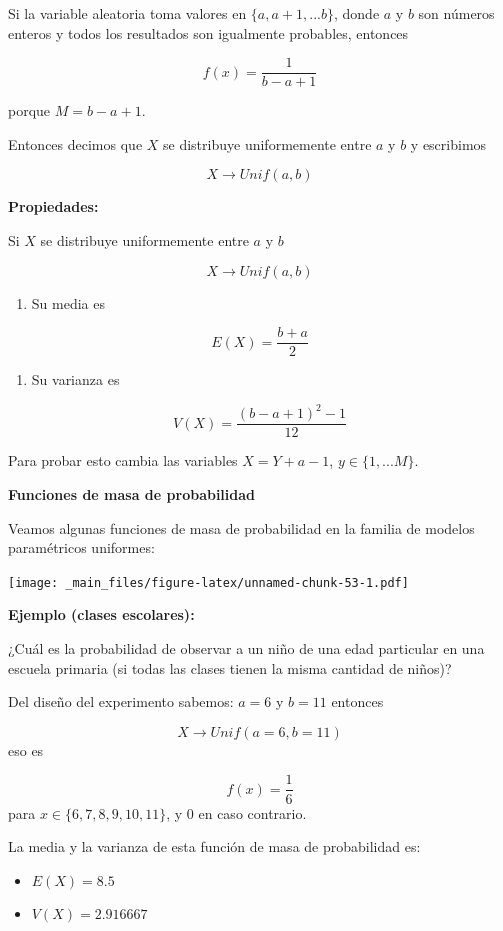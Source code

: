 \documentclass[
]{book}
\providecommand{\tightlist}{%
  \setlength{\itemsep}{0pt}\setlength{\parskip}{0pt}}
\begin{document}
Si la variable aleatoria toma valores en \(\{a, a+1, ...b\}\), donde \(a\) y \(b\) son números enteros y todos los resultados son igualmente probables, entonces

\[f(x)=\frac{1}{b-a+1}\]

porque \(M=b-a+1\).

Entonces decimos que \(X\) se distribuye uniformemente entre \(a\) y \(b\) y escribimos

\[X \rightarrow Unif(a,b)\]

\textbf{Propiedades:}

Si \(X\) se distribuye uniformemente entre \(a\) y \(b\)

\[X \rightarrow Unif(a,b)\]

\begin{enumerate}
\def\labelenumi{\arabic{enumi})}
\tightlist
\item
  Su media es
\end{enumerate}

\[E(X)= \frac{b+a}{2}\]

\begin{enumerate}
\def\labelenumi{\arabic{enumi})}
\setcounter{enumi}{1}
\tightlist
\item
  Su varianza es
\end{enumerate}

\[V(X)= \frac{(b-a+1)^2-1}{12}\]

Para probar esto cambia las variables \(X=Y+a-1\), \(y \in \{1,...M\}\).

\textbf{Funciones de masa de probabilidad}

Veamos algunas funciones de masa de probabilidad en la familia de modelos paramétricos uniformes:

\texttt{[image: \_main\_files/figure-latex/unnamed-chunk-53-1.pdf]}

\textbf{Ejemplo (clases escolares):}

¿Cuál es la probabilidad de observar a un niño de una edad particular en una escuela primaria (si todas las clases tienen la misma cantidad de niños)?

Del diseño del experimento sabemos: \(a=6\) y \(b=11\) entonces

\[X \rightarrow Unif(a=6, b=11)\] eso es

\[f(x)=\frac{1}{6}\] para \(x\in \{6,7,8,9,10,11\}\), y \(0\) en caso contrario.

La media y la varianza de esta función de masa de probabilidad es:

\begin{itemize}
\tightlist
\item
  \(E(X)=8.5\)
\item
  \(V(X)=2.916667\)
\end{itemize}
\end{document}

